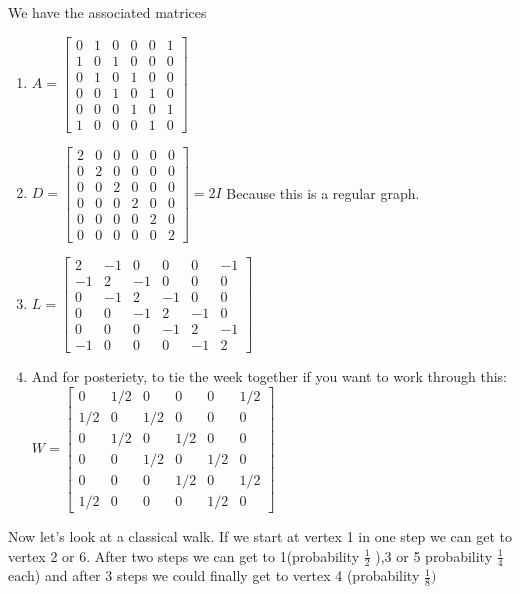 \documentclass{article}
\theoremstyle{definition}
\theoremstyle{remark}
\newcommand{\half}{\frac{1}{2}}
\begin{document}
We have the associated matrices
\begin{enumerate}
	\item $A = \begin{bmatrix}
		0 & 1 & 0 & 0 & 0 & 1\\
		1 & 0 & 1 & 0 & 0 & 0\\
		0 & 1 & 0 & 1 & 0 & 0\\
		0 & 0 & 1 & 0 & 1 & 0\\
		0 & 0 & 0 & 1 & 0 & 1\\
		1 & 0 & 0 & 0 & 1 & 0
	\end{bmatrix}$
    \item $D = \begin{bmatrix}
        2 & 0 & 0 & 0 & 0 & 0\\
        0 & 2 & 0 & 0 & 0 & 0\\
        0 & 0 & 2 & 0 & 0 & 0\\
        0 & 0 & 0 & 2 & 0 & 0\\
        0 & 0 & 0 & 0 & 2 & 0\\
        0 & 0 & 0 & 0 & 0 & 2
    \end{bmatrix} = 2I$ Because this is a regular graph.
    \item  $L = \begin{bmatrix}
    	2 & -1 & 0 & 0 & 0 & -1\\
    	-1 & 2 & -1 & 0 & 0 & 0\\
    	0 & -1 & 2 & -1 & 0 & 0\\
    	0 & 0 & -1 & 2 & -1 & 0\\
    	0 & 0 & 0 & -1 & 2 & -1\\
    	-1 & 0 & 0 & 0 & -1 & 2
    \end{bmatrix}$
    \item  And for posteriety, to tie the week together if you want to work through this:
    $W = \begin{bmatrix}
    0 & 1/2 & 0 & 0 & 0 & 1/2\\
    1/2 & 0 & 1/2 & 0 & 0 & 0\\
    0 & 1/2 & 0 & 1/2 & 0 & 0\\
    0 & 0 & 1/2 & 0 & 1/2 & 0\\
    0 & 0 & 0 & 1/2 & 0 & 1/2\\
    1/2 & 0 & 0 & 0 & 1/2 & 0
    \end{bmatrix}$
    \end{enumerate}

Now let's look at a classical walk.  If we start at vertex 1 in one step we can get to vertex 2 or 6.  After two steps we can get to 1(probability $\half$ ),3 or 5 probability $\frac{1}{4}$ each) and after 3 steps we could finally get to vertex 4 (probability $\frac{1}{8})$
\end{document}
